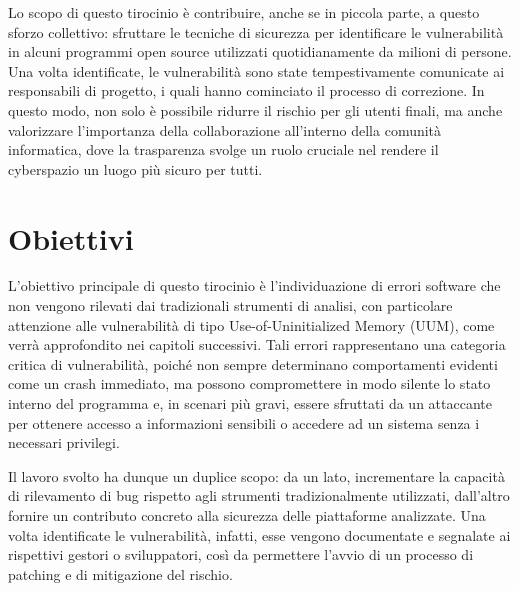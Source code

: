 Lo scopo di questo tirocinio è contribuire, anche se in piccola parte, a questo sforzo collettivo: sfruttare le tecniche di sicurezza per identificare le vulnerabilità in alcuni programmi open source utilizzati quotidianamente da milioni di persone. Una volta identificate, le vulnerabilità sono state tempestivamente comunicate ai responsabili di progetto, i quali hanno cominciato il processo di correzione. In questo modo, non solo è possibile ridurre il rischio per gli utenti finali, ma anche valorizzare l’importanza della collaborazione all’interno della comunità informatica, dove la trasparenza svolge un ruolo cruciale nel rendere il cyberspazio un luogo più sicuro per tutti.

\section{Obiettivi}

L’obiettivo principale di questo tirocinio è l’individuazione di errori software che non vengono rilevati dai tradizionali strumenti di analisi, con particolare attenzione alle vulnerabilità di tipo Use-of-Uninitialized Memory (UUM), come verrà approfondito nei capitoli successivi. Tali errori rappresentano una categoria critica di vulnerabilità, poiché non sempre determinano comportamenti evidenti come un crash immediato, ma possono compromettere in modo silente lo stato interno del programma e, in scenari più gravi, essere sfruttati da un attaccante per ottenere accesso a informazioni sensibili o accedere ad un sistema senza i necessari privilegi.

Il lavoro svolto ha dunque un duplice scopo: da un lato, incrementare la capacità di rilevamento di bug rispetto agli strumenti tradizionalmente utilizzati, dall’altro fornire un contributo concreto alla sicurezza delle piattaforme analizzate. Una volta identificate le vulnerabilità, infatti, esse vengono documentate e segnalate ai rispettivi gestori o sviluppatori, così da permettere l’avvio di un processo di patching e di mitigazione del rischio.
